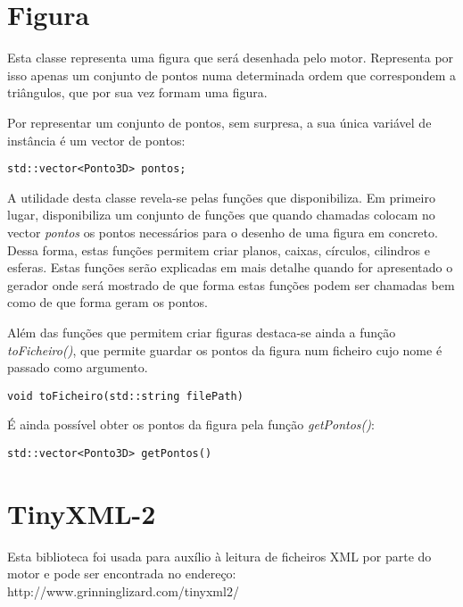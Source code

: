 \newpage

\section{Figura}

Esta classe representa uma figura que será desenhada pelo motor. Representa por isso apenas um conjunto de pontos numa determinada ordem que correspondem a triângulos, que por sua vez formam uma figura.

Por representar um conjunto de pontos, sem surpresa, a sua única variável de instância é um vector de pontos:

\begin{Verbatim}
std::vector<Ponto3D> pontos;
\end{Verbatim}

A utilidade desta classe revela-se pelas funções que disponibiliza. Em primeiro lugar, disponibiliza um conjunto de funções que quando chamadas colocam no vector \textit{pontos} os pontos necessários para o desenho de uma figura em concreto. Dessa forma, estas funções permitem criar planos, caixas, círculos, cilindros e esferas. Estas funções serão explicadas em mais detalhe quando for apresentado o gerador onde será mostrado de que forma estas funções podem ser chamadas bem como de que forma geram os pontos.

Além das funções que permitem criar figuras destaca-se ainda a função \textit{toFicheiro()}, que permite guardar os pontos da figura num ficheiro cujo nome é passado como argumento.

\begin{Verbatim}
void toFicheiro(std::string filePath)
\end{Verbatim}

É ainda possível obter os pontos da figura pela função \textit{getPontos()}:

\begin{Verbatim}
std::vector<Ponto3D> getPontos()
\end{Verbatim}

\section{TinyXML-2}

Esta biblioteca foi usada para auxílio à leitura de ficheiros XML por parte do motor e pode ser encontrada no endereço: http://www.grinninglizard.com/tinyxml2/
